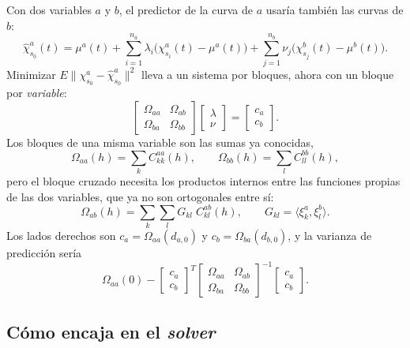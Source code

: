 \documentclass[11pt,a4paper]{article}
\begin{document}
Con dos variables $a$ y $b$, el predictor de la curva de $a$ usaría también
las curvas de $b$:
\[
  \hat\chi^{a}_{s_0}(t) = \mu^{a}(t)
  + \sum_{i=1}^{n_a} \lambda_i \bigl(\chi^{a}_{s_i}(t) - \mu^{a}(t)\bigr)
  + \sum_{j=1}^{n_b} \nu_j \bigl(\chi^{b}_{s_j}(t) - \mu^{b}(t)\bigr).
\]
Minimizar $E\lVert \chi^{a}_{s_0} - \hat\chi^{a}_{s_0}\rVert^2$ lleva a un
sistema por bloques, ahora con un bloque por \emph{variable}:
\begin{equation}
  \begin{bmatrix}
    \Omega_{aa} & \Omega_{ab} \\
    \Omega_{ba} & \Omega_{bb}
  \end{bmatrix}
  \begin{bmatrix} \lambda \\ \nu \end{bmatrix}
  =
  \begin{bmatrix} c_{a} \\ c_{b} \end{bmatrix}.
  \label{eq:lambda-multi}
\end{equation}
Los bloques de una misma variable son las sumas ya conocidas,
\[
  \Omega_{aa}(h) = \sum_{k} C^{aa}_{kk}(h),
  \qquad
  \Omega_{bb}(h) = \sum_{l} C^{bb}_{ll}(h),
\]
pero el bloque cruzado necesita los productos internos entre las funciones
propias de las dos variables, que ya no son ortogonales entre sí:
\begin{equation}
  \Omega_{ab}(h) = \sum_{k}\sum_{l} G_{kl}\; C^{ab}_{kl}(h),
  \qquad
  G_{kl} = \langle \xi^{a}_{k}, \xi^{b}_{l} \rangle .
  \label{eq:cruzado}
\end{equation}
Los lados derechos son $c_a = \Omega_{aa}(d_{a,0})$ y $c_b =
\Omega_{ba}(d_{b,0})$, y la varianza de predicción sería
\[
  \Omega_{aa}(0) - \begin{bmatrix} c_a \\ c_b \end{bmatrix}^{T}
  \begin{bmatrix}
    \Omega_{aa} & \Omega_{ab} \\
    \Omega_{ba} & \Omega_{bb}
  \end{bmatrix}^{-1}
  \begin{bmatrix} c_a \\ c_b \end{bmatrix}.
\]

\subsection{Cómo encaja en el \emph{solver}}
\end{document}
